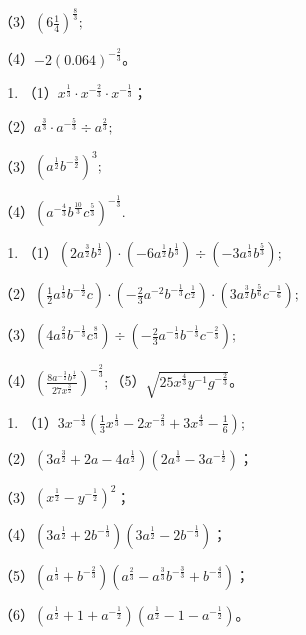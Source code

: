 （3）\(\left(6\frac{1}{4}\right)^{\frac{8}{3}};\)

（4）\(-2(0.064)^{-\frac{2}{3}}\)。

\begin{enumerate}[start=3]
\item
  （1）\(x^{\frac{1}{3}} \cdot x^{-\frac{2}{3}} \cdot x^{-\frac{1}{3}}\)；
\end{enumerate}

（2）\(a^{\frac{3}{3}} \cdot a^{-\frac{5}{3}} \div a^{\frac{2}{3}};\)

（3）\((a^{\frac{1}{2}}b^{-\frac{3}{2}})^{3};\)

（4）\((a^{-\frac{4}{3}}b^{\frac{10}{3}}c^{\frac{5}{3}})^{-\frac{1}{3}}.\)

\begin{enumerate}[start=4]
\item
  （1）\((2a^{\frac{3}{2}}b^{\frac{1}{2}})\cdot (-6a^{\frac{1}{2}}b^{\frac{1}{3}})\div (-3a^{\frac{1}{3}}b^{\frac{5}{3}});\)
\end{enumerate}

（2）\(\left(\frac{1}{2} a^{\frac{1}{3}}b^{-\frac{1}{2}}c\right)\cdot \left(-\frac{2}{3} a^{-2}b^{-\frac{1}{3}}c^{\frac{1}{2}}\right)\cdot (3a^{\frac{3}{2}}b^{\frac{5}{6}}c^{-\frac{1}{6}});\)

（3）\((4a^{\frac{2}{3}}b^{-\frac{1}{3}}c^{\frac{8}{3}})\div \left(-\frac{2}{3} a^{-\frac{1}{3}}b^{-\frac{1}{3}}c^{-\frac{2}{3}}\right);\)

（4）\(\left(\frac{8a^{-\frac{3}{2}}b^{\frac{1}{3}}}{27x^{\frac{3}{2}}}\right)^{-\frac{2}{3}};\)（5）\(\sqrt{25x^{\frac{4}{3}}y^{-1}g^{-\frac{2}{3}}}\)。

\begin{enumerate}[start=5]
\item
  （1）\(3x^{-\frac{1}{3}}\left(\frac{1}{3} x^{\frac{1}{3}} - 2x^{-\frac{2}{3}} + 3x^{\frac{4}{3}} - \frac{1}{6}\right);\)
\end{enumerate}

（2）\((3a^{\frac{3}{2}} + 2a - 4a^{\frac{1}{2}})(2a^{\frac{1}{3}} - 3a^{-\frac{1}{2}})\)；

（3）\((x^{\frac{1}{2}} - y^{-\frac{1}{2}})^{2}\)；

（4）\((3a^{\frac{1}{2}} + 2b^{-\frac{1}{3}})(3a^{\frac{1}{2}} - 2b^{-\frac{1}{3}})\)；

（5）\((a^{\frac{1}{3}} + b^{-\frac{2}{3}})(a^{\frac{2}{3}} - a^{\frac{3}{3}}b^{-\frac{3}{3}} + b^{-\frac{4}{3}})\)；

（6）\((a^{\frac{1}{2}} + 1 + a^{-\frac{1}{2}})(a^{\frac{1}{2}} - 1 - a^{-\frac{1}{2}})\)。

